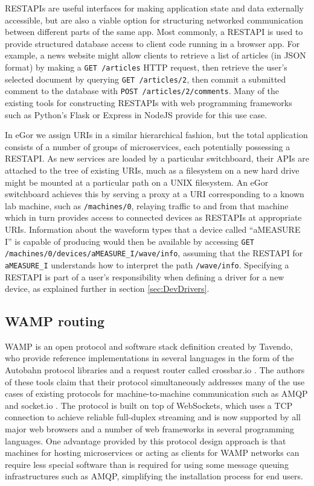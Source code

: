 \documentclass[../thesis]{subfiles}
\begin{document}
\glspl{RESTAPI} are useful interfaces for making application state and
data externally accessible, but are also a viable option for
structuring networked communication between different parts of the
same app. Most commonly, a \gls{RESTAPI} is used to provide structured
database access to client code running in a browser app. For example,
a news website might allow clients to retrieve a list of articles (in
\gls{JSON} format) by making a \texttt{GET /articles} HTTP request,
then retrieve the user's selected document by querying \texttt{GET
  /articles/2}, then commit a submitted comment to the database with
\texttt{POST /articles/2/comments}. Many of the existing tools for
constructing \glspl{RESTAPI} with web programming frameworks such as
Python's Flask \cite{Flask} or Express in NodeJS \cite{Express}
provide for this use case.

In eGor we assign URIs in a similar hierarchical fashion, but the
total application consists of a number of groups of microservices,
each potentially possessing a \gls{RESTAPI}. As new services are
loaded by a particular switchboard, their \glspl{API} are attached to
the tree of existing \glspl{URI}, much as a filesystem on a new hard
drive might be mounted at a particular path on a UNIX filesystem.  An
eGor switchboard achieves this by serving a proxy at a \gls{URI}
corresponding to a known lab machine, such as \texttt{/machines/0},
relaying traffic to and from that machine which in turn provides
access to connected devices as \glspl{RESTAPI} at appropriate
\glspl{URI}. Information about the waveform types that a device called
``aMEASURE I'' is capable of producing would then be available by
accessing \texttt{GET /machines/0/devices/aMEASURE\_I/wave/info},
assuming that the \gls{RESTAPI} for \texttt{aMEASURE\_I} understands
how to interpret the path \texttt{/wave/info}. Specifying a
\gls{RESTAPI} is part of a user's responsibility when defining a
driver for a new device, as explained further in section
\ref{sec:DevDrivers}.

\subsection{WAMP routing}
\gls{WAMP} is an open protocol and software stack definition created
by Tavendo, who provide reference implementations in several languages
in the form of the Autobahn protocol libraries and a request router
called crossbar.io \cite{CrossbarIO}. The authors of these tools claim
that their protocol simultaneously addresses many of the use cases of
existing protocols for machine-to-machine communication such as
\gls{AMQP} and socket.io \cite{socketio}. The protocol is built on
top of WebSockets, which uses a TCP connection to achieve reliable
full-duplex streaming and is now supported by all major web browsers
and a number of web frameworks in several programming languages. One
advantage provided by this protocol design approach is that machines
for hosting microservices or acting as clients for \gls{WAMP} networks
can require less special software than is required for using some
message queuing infrastructures such as \gls{AMQP}, simplifying the
installation process for end users.
\end{document}
